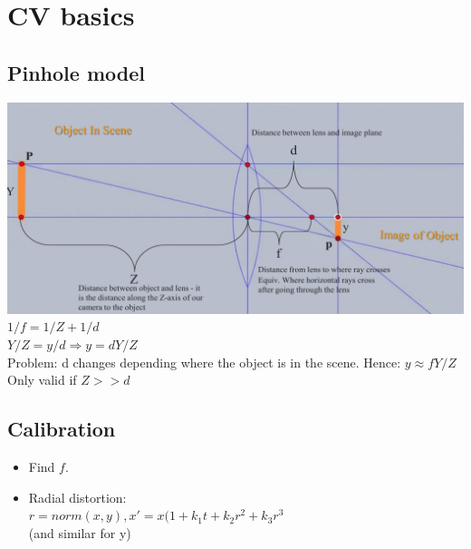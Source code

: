 \section{CV basics}
\subsection*{Pinhole model}
\includegraphics[width=\linewidth]{Images/Pinhole.png}
$1/f = 1/Z + 1/d$ \\
$Y/Z = y/d \Rightarrow y = d Y/Z$\\
Problem: d changes depending where the object is in the scene. Hence:
$y \approx f Y/Z$\\
\alert{Only valid if $Z >> d$}

\subsection*{Calibration}
\begin{itemize}
  \item Find $f$.
  \item Radial distortion:\\
    $r = norm(x, y), x' = x( 1 + k_1 t + k_2 r^2
    + k_3 r^3$\\
    (and similar for y)
\end{itemize}

